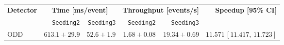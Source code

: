 \renewcommand{\arraystretch}{1.4}
\setlength{\tabcolsep}{5pt}
\footnotesize
\begin{tabular}{lrrrrr}
\toprule
\textbf{Detector} & \multicolumn{2}{c}{\textbf{Time [ms/event]}} & \multicolumn{2}{c}{\textbf{Throughput [events/s]}} & \textbf{Speedup [95\% CI]} \\
\cmidrule(lr){2-3}\cmidrule(lr){4-5}
 & \texttt{Seeding2} & \texttt{Seeding3} & \texttt{Seeding2} & \texttt{Seeding3} & \\
\midrule
\rowcolor{gray!15}
ODD & $613.1 \pm 29.9$ & $52.6 \pm 1.9$ & $1.68 \pm 0.08$ & $19.34 \pm 0.69$ & $11.571\,[11.417,\,11.723]$ \\
\bottomrule
\end{tabular}
